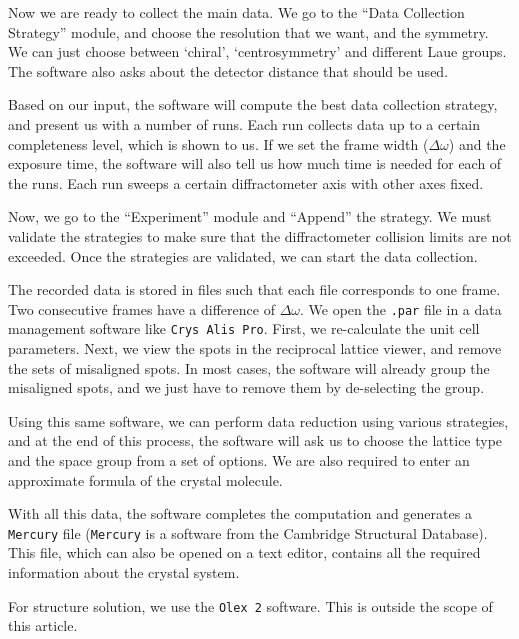 Now we are ready to collect the main data. We go to the ``Data Collection Strategy'' module, and choose the resolution that we want, and the symmetry. We can just choose between `chiral',  `centrosymmetry' and different Laue groups. The software also asks about the detector distance that should be used.

Based on our input, the software will compute the best data collection strategy, and present us with a number of runs. Each run collects data up to a certain completeness level, which is shown to us. If we set the frame width ($\Delta \omega$) and the exposure time, the software will also tell us how much time is needed for each of the runs. Each run sweeps a certain diffractometer axis with other axes fixed.

Now, we go to the ``Experiment'' module and ``Append'' the strategy. We must validate the strategies to make sure that the diffractometer collision limits are not exceeded. Once the strategies are validated, we can start the data collection.

The recorded data is stored in files such that each file corresponds to one frame. Two consecutive frames have a difference of $\Delta \omega.$ We open the \texttt{.par} file in a data management software like \texttt{Crys Alis Pro}. First, we re-calculate the unit cell parameters. Next, we view the spots in the reciprocal lattice viewer, and remove the sets of misaligned spots. In most cases, the software will already group the misaligned spots, and we just have to remove them by de-selecting the group.

Using this same software, we can perform data reduction using various strategies, and at the end of this process, the software will ask us to choose the lattice type and the space group from a set of options. We are also required to enter an approximate formula of the crystal molecule.

With all this data, the software completes the computation and generates a \texttt{Mercury} file (\texttt{Mercury} is a software from the Cambridge Structural Database). This file, which can also be opened on a text editor, contains all the required information about the crystal system.

For structure solution, we use the \texttt{Olex 2} software. This is outside the scope of this article.
